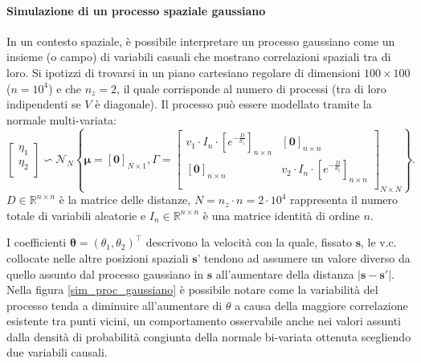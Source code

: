 \paragraph{Simulazione di un processo spaziale gaussiano}
In un contesto spaziale, è possibile interpretare un processo gaussiano come un insieme (o campo) di variabili casuali che mostrano correlazioni spaziali tra di loro. Si ipotizzi di trovarsi in un piano cartesiano regolare di dimensioni $100\times100$ ($n=10^4$) e che $n_z =2$, il quale corrisponde al numero di processi (tra di loro indipendenti se $V$ è diagonale). Il processo può essere modellato tramite la normale multi-variata:
\[
	\begin{bmatrix}
		\eta_1 \\
		\eta_2 \\
	\end{bmatrix}\backsim \mathcal{N}_N\left\{\boldsymbol{\mu}=[\mathbf{0}]_{N\times 1}, \Gamma = 
	\begin{bmatrix}
		v_1\cdot I_{n}\cdot [e^{-\frac{D}{\theta_1}}]_{n\times n} & [\mathbf{0}]_{n\times n} \\
		[\mathbf{0}]_{n\times n} & v_2\cdot I_{n}\cdot [e^{-\frac{D}{\theta_2}}]_{n\times n} \\
	\end{bmatrix}_{N\times N}
	\right\}.
\]
$D\in\mathbb{R}^{n\times n}$ è la matrice delle distanze, $N=n_z\cdot n = 2\cdot 10^4$ rappresenta il numero totale di variabili aleatorie e $I_n\in\mathbb{R}^{n\times n}$ è una matrice identità di ordine $n$.
\par I coefficienti $\boldsymbol{\theta} = (\theta_1,\theta_2)^\top$ descrivono la velocità con la quale, fissato $\mathbf{s}$, le v.c. collocate nelle altre posizioni spaziali $\mathbf{s}$' tendono ad assumere un valore diverso da quello assunto dal processo gaussiano in $\mathbf{s}$ all'aumentare della distanza $|\mathbf{s} - \mathbf{s}'|$. Nella figura \ref{sim_proc_gaussiano} è possibile notare come la variabilità del processo tenda a diminuire all'aumentare di $\theta$ a causa della maggiore correlazione esistente tra punti vicini, un comportamento osservabile anche nei valori assunti dalla densità di probabilità congiunta della normale bi-variata ottenuta scegliendo due variabili causali.

